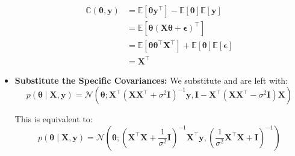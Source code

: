 \begin{itemize}
          \begin{align*}
            \mathbb{C}(\bm{\theta}, \bm{y}) 
            &= \mathbb{E}[\bm{\theta} \bm{y}^\top] - \mathbb{E}[\bm{\theta}] \mathbb{E}[\bm{y}] \\
            &= \mathbb{E}[\bm{\theta} (\bm{X\theta} + \bm{\epsilon})^\top] \\
            &= \mathbb{E}[\bm{\theta} \bm{\theta}^\top \bm{X}^\top] + \mathbb{E}[\bm{\theta}] \mathbb{E}[\bm{\epsilon}] \\
            &= \bm{X}^\top
            \end{align*}

            


    \item \textbf{Substitute the Specific Covariances:}
            We substitute and are left with:
\[
p(\bm{\theta} \mid \bm{X}, \bm{y}) = \mathcal{N}\left(\bm{\theta}; \bm{X}^\top \left(\bm{X} \bm{X}^\top + \sigma^2 \bm{I} \right)^{-1} \bm{y}, \bm{I} - \bm{X}^\top \left(\bm{X} \bm{X}^\top - \sigma^2 \bm{I}\right) \bm{X} \right)
\]

            This is equivalent to:
\[
p(\bm{\theta} \mid \bm{X}, \bm{y}) = \mathcal{N}\left(\bm{\theta}; \left(\bm{X}^\top \bm{X} + \frac{1}{\sigma^2} \bm{I} \right)^{-1} \bm{X}^\top \bm{y}, \left(\frac{1}{\sigma^2} \bm{X}^\top \bm{X} + \bm{I} \right)^{-1} \right)
\]

         
  
\end{itemize}




